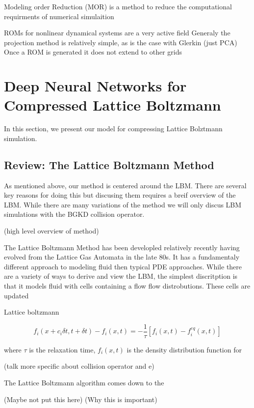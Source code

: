 \documentclass{article}
\begin{document}
Modeling order Reduction (MOR) is a method to reduce the computational requirments of numerical simulaition

ROMs for nonlinear dynamical systems are a very active field
Generaly the projection method is relatively simple, as is the case with Glerkin (just PCA)
Once a ROM is generated it does not extend to other grids



\section{Deep Neural Networks for Compressed Lattice Boltzmann}

In this section, we present our model for compressing Lattice Bolztmann simulation.

\subsection{Review: The Lattice Boltzmann Method}

As mentioned above, our method is centered around the LBM. There are several key reasons for doing this but discusing them requires a breif overview of the LBM. While there are many variations of the method we will only discus LBM simulations with the BGKD collision operator. 

(high level overview of method)

The Lattice Boltzmann Method has been developled relatively recently having evolved from the Lattice Gas Automata in the late 80s. It has a fundamentaly different approach to modeling fluid then typical PDE approaches. While there are a variety of ways to derive and view the LBM, the simplest discritption is that it models fluid with cells containing a flow flow distrobutions. These cells are updated 

Lattice boltzmann 

\begin{equation}
  f_i(x+c_i \delta{t}, t+ \delta{t}) - f_i(x,t) = -\frac{1}{\tau} [f_i(x,t) - f_i^{eq}(x,t)]
\end{equation}

where $\tau$ is the relaxation time, $f_i(x,t)$ is the density distribution function for

(talk more specific about collision operator and e)

The Lattice Boltzmann algorithm comes down to the 

(Maybe not put this here)
(Why this is important)
\end{document}
